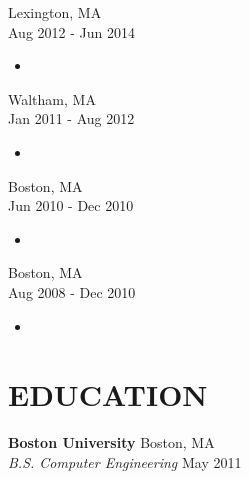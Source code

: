 \documentclass{article}
\begin{document}
 \hfill Lexington, MA \\
 \hfill Aug 2012 - Jun 2014
\begin{itemize}
\item 
\end{itemize}

 \hfill Waltham, MA \\
 \hfill Jan 2011 - Aug 2012
\begin{itemize}
\item 
\end{itemize}

 \hfill Boston, MA \\
 \hfill Jun 2010 - Dec 2010
\begin{itemize}
\item 
\end{itemize}

 \hfill Boston, MA \\
 \hfill Aug 2008 - Dec 2010
\begin{itemize}
\item 
\end{itemize}

\section*{EDUCATION}

{\bf Boston University} \hfill Boston, MA \\
{\sl B.S. Computer Engineering} \hfill May 2011
\end{document}
